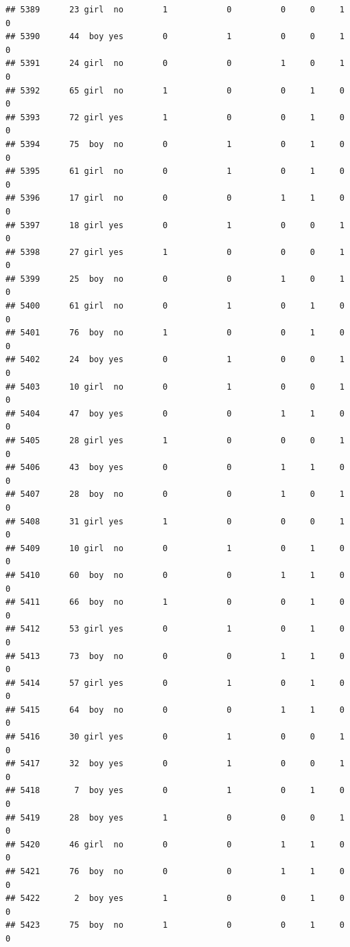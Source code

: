 \documentclass[man]{apa6}
\begin{document}
\begin{verbatim}
## 5389      23 girl  no        1            0          0     0     1     0
## 5390      44  boy yes        0            1          0     0     1     0
## 5391      24 girl  no        0            0          1     0     1     0
## 5392      65 girl  no        1            0          0     1     0     0
## 5393      72 girl yes        1            0          0     1     0     0
## 5394      75  boy  no        0            1          0     1     0     0
## 5395      61 girl  no        0            1          0     1     0     0
## 5396      17 girl  no        0            0          1     1     0     0
## 5397      18 girl yes        0            1          0     0     1     0
## 5398      27 girl yes        1            0          0     0     1     0
## 5399      25  boy  no        0            0          1     0     1     0
## 5400      61 girl  no        0            1          0     1     0     0
## 5401      76  boy  no        1            0          0     1     0     0
## 5402      24  boy yes        0            1          0     0     1     0
## 5403      10 girl  no        0            1          0     0     1     0
## 5404      47  boy yes        0            0          1     1     0     0
## 5405      28 girl yes        1            0          0     0     1     0
## 5406      43  boy yes        0            0          1     1     0     0
## 5407      28  boy  no        0            0          1     0     1     0
## 5408      31 girl yes        1            0          0     0     1     0
## 5409      10 girl  no        0            1          0     1     0     0
## 5410      60  boy  no        0            0          1     1     0     0
## 5411      66  boy  no        1            0          0     1     0     0
## 5412      53 girl yes        0            1          0     1     0     0
## 5413      73  boy  no        0            0          1     1     0     0
## 5414      57 girl yes        0            1          0     1     0     0
## 5415      64  boy  no        0            0          1     1     0     0
## 5416      30 girl yes        0            1          0     0     1     0
## 5417      32  boy yes        0            1          0     0     1     0
## 5418       7  boy yes        0            1          0     1     0     0
## 5419      28  boy yes        1            0          0     0     1     0
## 5420      46 girl  no        0            0          1     1     0     0
## 5421      76  boy  no        0            0          1     1     0     0
## 5422       2  boy yes        1            0          0     1     0     0
## 5423      75  boy  no        1            0          0     1     0     0

\end{verbatim}
\end{document}

